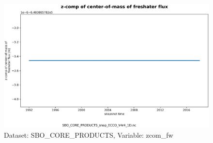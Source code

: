 \begin{figure}[H]
\centering
\includegraphics[scale=0.55]{../images/plots/v4r4/oneD_plots/SBO_Core_Products/zcom_fw.png}
\caption{Dataset: SBO\_CORE\_PRODUCTS, Variable: zcom\_fw}
\label{tab:table-SBO_CORE_PRODUCTS_zcom_fw-Plot}
\end{figure}
\newpage
\pagebreak
